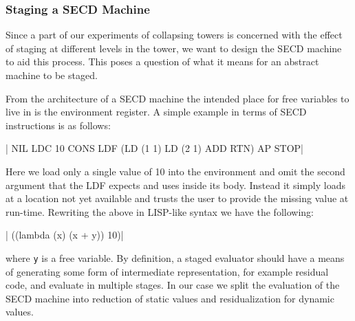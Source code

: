 \documentclass[a4paper,12pt,twoside,openright]{report}
\theoremstyle{definition}
\begin{document}
\subsubsection{Staging a SECD Machine}\label{subsec:secd_staged}
Since a part of our experiments of collapsing towers is concerned with the effect of staging at different levels in the tower, we want to design the SECD machine to aid this process. This poses a question of what it means for an abstract machine to be staged.

From the architecture of a SECD machine the intended place for free variables to live in is the environment register. A simple example in terms of SECD instructions is as follows:

|   NIL LDC 10 CONS LDF (LD (1 1) LD (2 1) ADD RTN) AP STOP|

Here we load only a single value of 10 into the environment and omit the second argument that the LDF expects and uses inside its body. Instead it simply loads at a location not yet available and trusts the user to provide the missing value at run-time. Rewriting the above in LISP-like syntax we have the following:

|    ((lambda (x) (x + y)) 10)|

where \texttt{y} is a free variable. By definition, a staged evaluator should have a means of generating some form of intermediate representation, for example residual code, and evaluate in multiple stages. In our case we split the evaluation of the SECD machine into reduction of static values and residualization for dynamic values.
\end{document}
